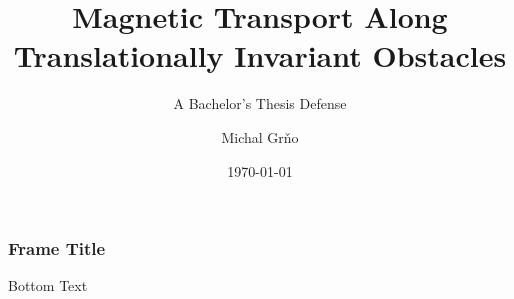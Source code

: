 \documentclass{beamer}
\title[Magnetic Transport]{Magnetic Transport Along \\ Translationally Invariant Obstacles}
\subtitle{A Bachelor's Thesis Defense}
\author{Michal Grňo}
\date{\today}
\begin{document}
\begin{frame}
    \titlepage
\end{frame}

\begin{frame}
    \frametitle{Frame Title}
    Bottom Text
\end{frame}
\end{document}
